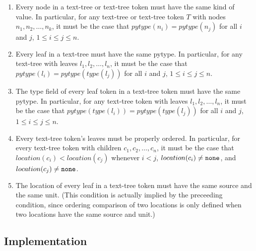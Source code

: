\documentclass[11pt]{article}
\begin{document}
  \begin{enumerate}


    \item Every node in a text-tree or text-tree token must have the
    same kind of value.  In particular, for any text-tree or text-tree
    token $T$ with nodes $n_1, n_2, \ldots, n_k$, it must be the case that
    $pytype(n_i) = pytype(n_j)$ for all $i$ and $j$, $1\leq i\leq j\leq n$.

    \item Every leaf in a text-tree must have the same pytype.  In
    particular, for any text-tree with leaves $l_1, l_2, \ldots, l_n$, it
    must be the case that $pytype(l_i) = pytype(type(l_j))$ for all
    $i$ and $j$, $1\leq i\leq j\leq n$.

    \item The type field of every leaf token in a text-tree token must
    have the same pytype.  In particular, for any text-tree token with
    leaves $l_1, l_2, \ldots, l_n$, it must be the case that
    $pytype(type(l_i)) = pytype(type(l_j))$ for all $i$ and $j$, $1\leq
    i\leq j\leq n$.

    \item Every text-tree token's leaves must be properly ordered.  In
    particular, for every text-tree token with children $c_1, c_2, \ldots,
    c_n$, it must be the case that $location(c_i)<location(c_j)$
    whenever $i<j$, $location(c_i)\neq\texttt{none}$, and
    $location(c_j)\neq\texttt{none}$.

    \item The location of every leaf in a text-tree token must have the
    same source and the same unit.  (This condition is actually implied
    by the preceeding condition, since ordering comparison of two
    locations is only defined when two locations have the same source
    and unit.)

  \end{enumerate}

  \subsection{Implementation}
\end{document}
